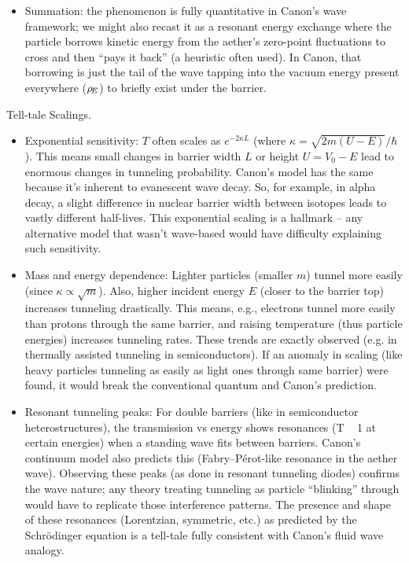 \documentclass[11pt]{article}
\begin{document}
\begin{itemize}
\item 
Summation: the phenomenon is fully quantitative in Canon’s wave framework; we might also recast it as a resonant energy exchange where the particle borrows kinetic energy from the aether’s zero-point fluctuations to cross and then “pays it back” (a heuristic often used). In Canon, that borrowing is just the tail of the wave tapping into the vacuum energy present everywhere ($\rho_{\!E}$) to briefly exist under the barrier.




\end{itemize}

Tell-tale Scalings.


\begin{itemize}

\item 
Exponential sensitivity: $T$ often scales as $e^{-2\kappa L}$ (where $\kappa =\sqrt{2m(U-E)}/\hbar$). This means small changes in barrier width $L$ or height $U=V_0-E$ lead to enormous changes in tunneling probability. Canon’s model has the same because it’s inherent to evanescent wave decay. So, for example, in alpha decay, a slight difference in nuclear barrier width between isotopes leads to vastly different half-lives. This exponential scaling is a hallmark – any alternative model that wasn’t wave-based would have difficulty explaining such sensitivity.




\item 
Mass and energy dependence: Lighter particles (smaller $m$) tunnel more easily (since $\kappa \propto \sqrt{m}$). Also, higher incident energy $E$ (closer to the barrier top) increases tunneling drastically. This means, e.g., electrons tunnel more easily than protons through the same barrier, and raising temperature (thus particle energies) increases tunneling rates. These trends are exactly observed (e.g. in thermally assisted tunneling in semiconductors). If an anomaly in scaling (like heavy particles tunneling as easily as light ones through same barrier) were found, it would break the conventional quantum and Canon’s prediction.




\item 
Resonant tunneling peaks: For double barriers (like in semiconductor heterostructures), the transmission vs energy shows resonances (T ~ 1 at certain energies) when a standing wave fits between barriers. Canon’s continuum model also predicts this (Fabry–Pérot-like resonance in the aether wave). Observing these peaks (as done in resonant tunneling diodes) confirms the wave nature; any theory treating tunneling as particle “blinking” through would have to replicate those interference patterns. The presence and shape of these resonances (Lorentzian, symmetric, etc.) as predicted by the Schrödinger equation is a tell-tale fully consistent with Canon’s fluid wave analogy.




\end{itemize}
\end{document}
